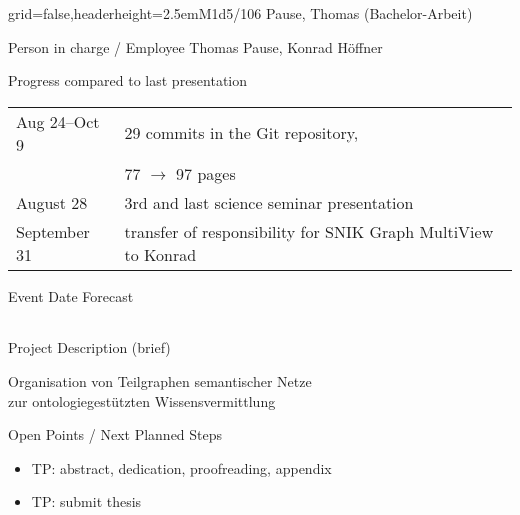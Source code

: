 \documentclass[english]{kiesgrube}
\begin{document}
\begin{poster}{grid=false,headerheight=2.5em}{}{M1d5/106 Pause, Thomas (Bachelor-Arbeit)}{}{}
\begin{posterbox}[name=person,column=0,row=0]{Person in charge / Employee}
Thomas Pause, Konrad Höffner
\end{posterbox}
\begin{posterbox}[name=progress,below=person]{Progress compared to last presentation}
\begin{tabulary}{\textwidth}{lL}
Aug 24--Oct 9	&29 commits in the Git repository,\\
				&77 $\rightarrow$ 97 pages\\
August 28	&3rd and last science seminar presentation\\
September 31	&transfer of responsibility for SNIK Graph MultiView to Konrad\\
\end{tabulary}
\end{posterbox}
\begin{posterbox}[name=event,below=progress]{Event Date Forecast}
\begin{tabulary}{\textwidth}{lL}
\end{tabulary}
\end{posterbox}
\begin{posterbox}[name=description,column=1,row=0]{Project Description (brief)}
\begin{center}
Organisation von Teilgraphen semantischer Netze\\
zur ontologiegestützten Wissensvermittlung
\end{center}
\end{posterbox}
\begin{posterbox}[name=open,column=1,below=description]{Open Points / Next Planned Steps}
\begin{itemize}
\item TP: abstract, dedication, proofreading, appendix
\item TP: submit thesis

\end{itemize}
\end{posterbox}
\end{poster}
\end{document}
